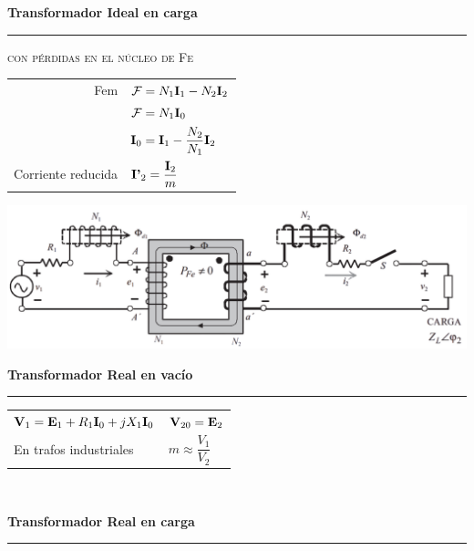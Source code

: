 \documentclass[11pt,a4paper]{article}
\newcommand{\fasor}[1]{\uppercase{\textbf{#1}}}
\newcommand{\subtitulo}[1]{
	\textbf{#1} \\ \vspace{.1cm} {\color{gray} \hrule}
}
\newcommand{\subsubtitulo}[1]{
	\begin{flushleft}
		\vspace{.1cm}
		\textsc{#1}
		\vspace{.1cm}
	\end{flushleft}
}
\begin{document}
\begin{cajita}
\begin{multicols}{2}
	
			\begin{center}
				\subtitulo{Transformador Ideal \textnormal{en carga}}
			\end{center}
		
			\vspace{-.6cm}
			
			\subsubtitulo{con pérdidas en el núcleo de Fe}
		
			\begin{tabular}{r l}
				Fem & $\mathcal{F} = N_1  \fasor{i}_1 - N_2 \fasor{i}_2$\\
				& $\mathcal{F} = N_1 \fasor{i}_0$\\
				& $\fasor{i}_0 = \fasor{i}_1 - \dfrac{N_2}{N_1} \fasor{i}_2$\\
				Corriente reducida & $\fasor{i'}_2 = \dfrac{\fasor{i}_2}{m}$ \\
			\end{tabular}
		
		\end{multicols}
	
	\newpage
	\includegraphics[width = .8\linewidth]{trafo-real}
	
	\begin{multicols}{2}
	
	\begin{center}
		\subtitulo{Transformador Real \textnormal{en vacío} \vspace{.1cm}}
	\end{center}
	
		\begin{tabular}{l l}
			$\fasor{v}_1 = \fasor{e}_1 + R_1 \fasor{i}_0 + j X_1 \fasor{i}_0$ & $\fasor{v}_{20} = \fasor{e}_2$ \\
			En trafos industriales & $m \approx \dfrac{V_1}{V_2}$\\
		\end{tabular}\\
	
		\begin{center}
			\subtitulo{Transformador Real \textnormal{en carga}}
		\end{center}		
		
	\end{multicols}
	

\end{cajita}
\end{document}
